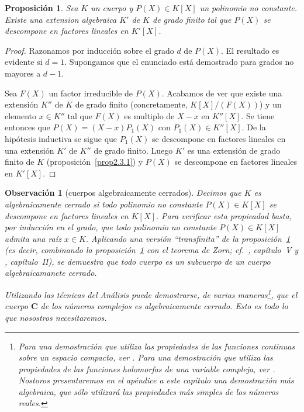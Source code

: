 \documentclass[oneside,bibtotoc,leqno,spanish]{amsbook}
\newcommand{\CC}{\mathbf{C}}
\numberwithin{equation}{section}
\theoremstyle{defi}
\theoremstyle{note}
\newtheorem{proposition}{Proposici\'on}
\theoremstyle{rem}
\newtheorem*{remark*}{Observaci\'on}
\numberwithin{theorem}{section}
\numberwithin{proposition}{section}
\numberwithin{definition}{section}
\numberwithin{lemma}{section}
\numberwithin{corollary}{section}
\numberwithin{example}{section}
\numberwithin{footnote}{section}%
\begin{document}
\begin{proposition}\label{prop2.3.3}
Sea $K$ un cuerpo y $P(X)\in K[X]$ un polinomio no constante. Existe una extension algebraica $K'$ de $K$ de
grado finito tal que $P(X)$ se descompone en factores lineales en $K'[X]$.
\end{proposition}

\begin{proof}
Razonamos por inducci\'on sobre el grado $d$ de $P(X)$. El resultado es evidente si $d=1$. Supongamos que el enunciado est\'a
demostrado para grados no mayores a $d-1$.

Sea $F(X)$ un factor irreducible de $P(X)$. Acabamos de ver que existe
una extensi\'on $K''$ de $K$ de grado finito (concretamente, $K[X]/(F(X))$) y un elemento $x\in K''$ tal que
$F(X)$ es multiplo de $X-x$ en $K''[X]$. Se tiene entonces que $P(X) = (X-x)P_{1}(X)$ con $P_{1}(X)\in K''[X]$.
De la hip\'otesis inductiva se sigue que $P_{1}(X)$ se descompone en factores lineales en una extensi\'on
$K'$ de $K''$ de grado finito. Luego $K'$ es una extensi\'on de grado finito de $K$
(proposici\'on~\ref{prop2.3.1}) y
$P(X)$ se descompone en factores lineales en $K'[X]$.
\end{proof}

\begin{remark*}[cuerpos algebraicamente cerrados]
Decimos que $K$ es {\em algebraicamente cerrado}
si {\em todo} polinomio no constante $P(X)\in K[X]$ se descompone en factores lineales en $K[X]$. Para verificar
esta propieadad basta, por inducci\'on en el grado, que todo polinomio no constante $P(X)\in K[X]$ admita una
ra\'iz $x\in K$. Aplicando una versi\'on ``transfinita'' de la proposici\'on~\ref{prop2.3.3} (es decir,
combinando la proposici\'on~\ref{prop2.3.3} con el
teorema de Zorn; cf.~\cite{Bourbaki1}, cap\'itulo~V y \cite{ZariskiSamuel}, cap\'itulo~II), se demuestra que todo cuerpo
es un subcuerpo de un cuerpo algebraicamanete cerrado.

Utilizando las t\'ecnicas del An\'alisis puede demostrarse, de varias maneras\footnote{Para una demostraci\'on que utiliza las
propiedades de las funciones continuas sobre un espacio compacto, ver \cite{Choquet}. Para una demostraci\'on que utiliza
las propiedades de las funciones holomorfas de una variable compleja, ver \cite{Cartan}. Nostoros presentaremos
en el ap\'endice a este cap\'itulo una demostraci\'on m\'as algebraica, que s\'olo utilizar\'a las propiedades
m\'as simples de los n\'umeros reales.}, que el cuerpo $\CC$ de los {\em n\'umeros complejos}
es algebraicamente cerrado. Esto es todo lo que nosostros necesitaremos.
\end{remark*}
\end{document}
